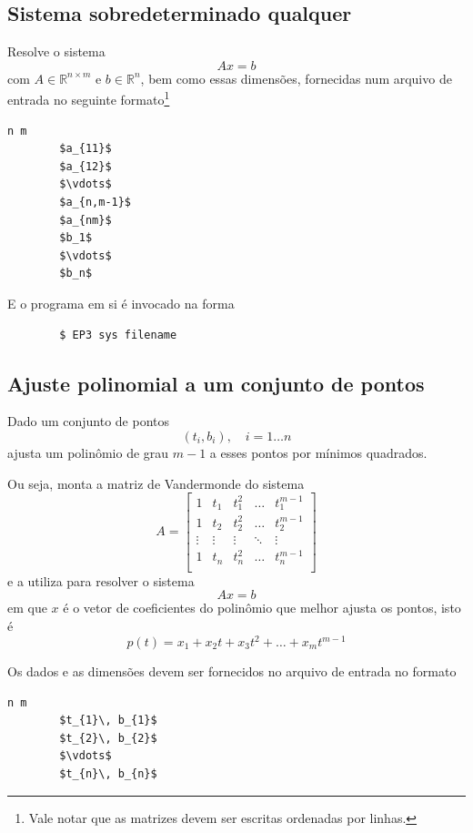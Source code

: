 \documentclass[a4paper,11pt]{article}
\begin{document}
        \subsection*{Sistema sobredeterminado qualquer}
            Resolve o sistema
                $$ Ax = b $$
            com $A \in \mathbb{R}^{n\times m}$ e $b \in \mathbb{R}^n$, bem como essas dimensões, fornecidas num arquivo de entrada no seguinte formato\footnote{Vale notar que as matrizes devem ser escritas ordenadas por linhas.}
        \begin{lstlisting}[mathescape, frame=single, caption={Formato do arquivo de entrada com um sistema sobredeterminado}]
        n m
        $a_{11}$
        $a_{12}$
        $\vdots$
        $a_{n,m-1}$
        $a_{nm}$
        $b_1$
        $\vdots$
        $b_n$
        \end{lstlisting}

            E o programa em si é invocado na forma

        \begin{lstlisting}
        $ EP3 sys filename
        \end{lstlisting}


        \subsection*{Ajuste polinomial a um conjunto de pontos}
            Dado um conjunto de pontos
                $$ (t_i, b_i),\quad i = 1\dots n$$
            ajusta um polinômio de grau $m-1$ a esses pontos por mínimos quadrados.

            Ou seja, monta a matriz de Vandermonde do sistema
            $$ A =
            \begin{bmatrix}
                1 & t_1 & t_1^2 & \dots & t_1^{m-1} \\
                1 & t_2 & t_2^2 & \dots & t_2^{m-1} \\
                \vdots & \vdots &\vdots & \ddots & \vdots   \\
                1 & t_n & t_n^2 & \dots & t_n^{m-1} \\
            \end{bmatrix}$$
            e a utiliza para resolver o sistema
            $$ Ax = b$$
            em que $x$ é o vetor de coeficientes do polinômio que melhor ajusta os pontos, isto é
            $$ p(t) = x_1 + x_2t + x_3t^2 + \dots + x_mt^{m-1}$$

            \newpage
            Os dados e as dimensões devem ser fornecidos no arquivo de entrada no formato
        \begin{lstlisting}[mathescape, frame=single, caption={Formato do arquivo de entrada com um conjunto de pontos}]
        n m
        $t_{1}\, b_{1}$
        $t_{2}\, b_{2}$
        $\vdots$
        $t_{n}\, b_{n}$
        \end{lstlisting}
\end{document}
